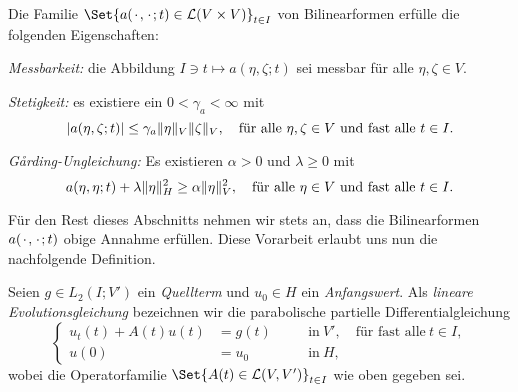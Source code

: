 \documentclass[../main.tex]{subfiles}
\begin{document}
\begin{Annahme}
\label{annahme:eigenschaften_der_bilinearform_a}
    Die Familie $\Set{a(\blank, \blank; t) \in \mathcal L(V \times V)}_{t \in I}$ von Bilinearformen erfülle die folgenden Eigenschaften:
    \leavevmode
    \begin{thmenumerate}
        \item \emph{Messbarkeit:} die Abbildung $I \ni t \mapsto a(\eta, \zeta; t)$ sei messbar für alle $\eta, \zeta \in V$.
        \item \emph{Stetigkeit:}
        es existiere ein $0 < \gamma_{a} < \infty$ mit
        \begin{equation}
            \label{eq:eigenschaften_der_bilinearform_a:stetigkeit}
            \abs{a(\eta, \zeta; t)} \leq \gamma_{a} \norm{\eta}_{V} \norm{\zeta}_{V}, \quad \fa \eta, \zeta \in V \text{ und fast alle } t \in I.
        \end{equation}
        \item \emph{G\r{a}rding-Ungleichung:}
        Es existieren $\alpha > 0$ und $\lambda \geq 0$ mit
        \begin{equation}
            \label{eq:eigenschaften_der_bilinearform_a:garding}
            a(\eta, \eta; t) + \lambda \norm{\eta}_{H}^{2} \geq \alpha \norm{\eta}_{V}^{2}, \quad \fa \eta \in V \text{ und fast alle } t \in I.
        \end{equation}
    \end{thmenumerate}
\end{Annahme}
%

Für den Rest dieses Abschnitts nehmen wir stets an, dass die Bilinearformen $a({\mkern2mu\cdot\mkern2mu}, {\mkern2mu\cdot\mkern2mu}; t)$ obige Annahme erfüllen.
Diese Vorarbeit erlaubt uns nun die nachfolgende Definition.

\begin{Definition}
\label{definition:lineare_evolutionsgleichung}
    Seien $g \in L_{2}(I; V')$ ein \emph{Quellterm} und $u_{0} \in H$ ein \emph{Anfangswert}.
    Als \emph{lineare Evolutionsgleichung} bezeichnen wir die parabolische partielle Differentialgleichung
    \begin{equation}
        \label{eq:lineare_evolutionsgleichung}
        \left\{
        \begin{aligned}
            u_{t}(t) + A(t) u(t) &= g(t)     \quad&&\text{in}~V', \quad \text{für fast alle}~t \in I, \\
            u(0) &= u_{0}                    \quad&&\text{in}~H,
        \end{aligned}
        \right.
    \end{equation}
    wobei die  Operatorfamilie $\Set{A(t) \in \mathcal L(V, V')}_{t \in I}$ wie oben gegeben sei.
\end{Definition}
\end{document}
